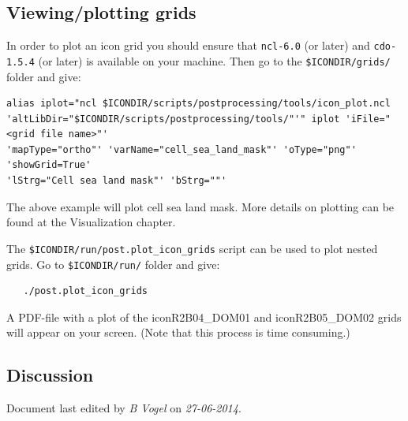 \subsection{Viewing/plotting grids}

In order to plot an icon grid you should ensure that \verb+ncl-6.0+ (or later) and \verb+cdo-1.5.4+ (or later) is available on your machine. Then go to the \verb+$ICONDIR/grids/+ folder and give:

\begin{small}
  \begin{verbatim}
alias iplot="ncl $ICONDIR/scripts/postprocessing/tools/icon_plot.ncl 
'altLibDir="$ICONDIR/scripts/postprocessing/tools/"'" iplot 'iFile="<grid file name>"' 
'mapType="ortho"' 'varName="cell_sea_land_mask"' 'oType="png"' 'showGrid=True' 
'lStrg="Cell sea land mask"' 'bStrg=""'
  \end{verbatim}
\end{small}



The above example will plot cell sea land mask. More details on plotting can be found at the Visualization chapter.

The \verb+$ICONDIR/run/post.plot_icon_grids+ script can be used to plot nested grids. Go to \verb+$ICONDIR/run/+ folder and give:

\begin{small}
  \begin{verbatim}
   ./post.plot_icon_grids  
  \end{verbatim}
\end{small}

A PDF-file with a plot of the iconR2B04\_DOM01 and iconR2B05\_DOM02 grids will appear on your screen. (Note that this process is time consuming.)

\newpage
\subsection*{Discussion}
Document last edited by \textit{B Vogel} on \textit{27-06-2014}.

